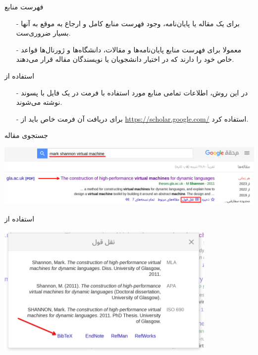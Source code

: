\begin{frame}{فهرست منابع}
\begin{itemize}\itemr
\item[-]
برای یک مقاله یا پایان‌نامه، وجود فهرست منابع کامل و ارجاع به موقع به آنها بسیار ضروری‌ست.

\item[-]
معمولا برای فهرست منابع پایان‌نامه‌ها و مقالات، دانشگاه‌ها و ژورنال‌ها قواعد خاص خود را دارند که در اختیار دانشجویان یا نویسندگان مقاله قرار می‌دهند.
\end{itemize}
\end{frame}

\begin{frame}{استفاده از }
\begin{itemize}\itemr
\item[-]
در این روش، اطلاعات تمامی منابع مورد استفاده با فرمت 
در یک فایل با پسوند  نوشته می‌شوند.

\item[-]
برای دریافت آن فرمت خاص باید از 
\url{https://scholar.google.com/}
استفاده کرد.
\end{itemize}
\end{frame}

\begin{frame}{جستجوی مقاله}
\begin{center}
\includegraphics[width=\textwidth]{docs/images/search}
\end{center}
\end{frame}

\begin{frame}{استفاده از }
\begin{center}
\includegraphics[width=0.8\textwidth, height=0.8\textheight]{docs/images/bibtex}
\end{center}
\end{frame}

